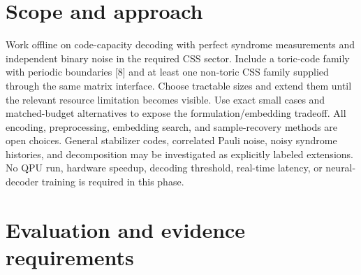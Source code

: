 \documentclass[11pt,letterpaper]{article}
\begin{document}
\section{Scope and approach}

Work offline on code-capacity decoding with perfect syndrome measurements and independent binary noise in the required CSS sector. Include a toric-code family with periodic boundaries [8] and at least one non-toric CSS family supplied through the same matrix interface. Choose tractable sizes and extend them until the relevant resource limitation becomes visible. Use exact small cases and matched-budget alternatives to expose the formulation/embedding tradeoff. All encoding, preprocessing, embedding search, and sample-recovery methods are open choices. General stabilizer codes, correlated Pauli noise, noisy syndrome histories, and decomposition may be investigated as explicitly labeled extensions. No QPU run, hardware speedup, decoding threshold, real-time latency, or neural-decoder training is required in this phase.\par

\section{Evaluation and evidence requirements}
\end{document}
